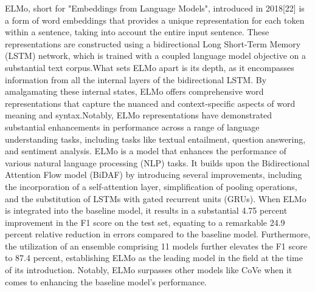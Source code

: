 \documentclass[conference]{IEEEtran}
\begin{document}

ELMo, short for "Embeddings from Language Models", introduced in 2018[22] is a form of word embeddings that provides a unique representation for each token within a sentence, taking into account the entire input sentence. These representations are constructed using a bidirectional Long Short-Term Memory (LSTM) network, which is trained with a coupled language model objective on a substantial text corpus.What sets ELMo apart is its depth, as it encompasses information from all the internal layers of the bidirectional LSTM. By amalgamating these internal states, ELMo offers comprehensive word representations that capture the nuanced and context-specific aspects of word meaning and syntax.Notably, ELMo representations have demonstrated substantial enhancements in performance across a range of language understanding tasks, including tasks like textual entailment, question answering, and sentiment analysis.
ELMo is a model that enhances the performance of various natural language processing (NLP) tasks. It builds upon the Bidirectional Attention Flow model (BiDAF) by introducing several improvements, including the incorporation of a self-attention layer, simplification of pooling operations, and the substitution of LSTMs with gated recurrent units (GRUs). When ELMo is integrated into the baseline model, it results in a substantial 4.75 percent improvement in the F1 score on the test set, equating to a remarkable 24.9 percent relative reduction in errors compared to the baseline model. Furthermore, the utilization of an ensemble comprising 11 models further elevates the F1 score to 87.4 percent, establishing ELMo as the leading model in the field at the time of its introduction. Notably, ELMo surpasses other models like CoVe when it comes to enhancing the baseline model's performance.
\end{document}
